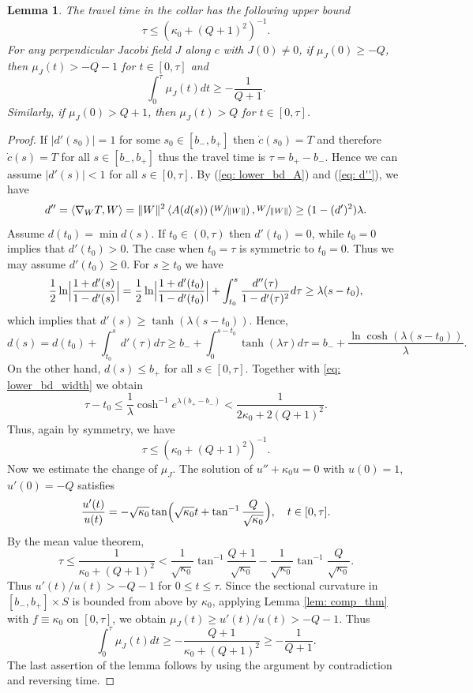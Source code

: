 \documentclass[10pt]{amsart}
\newtheorem{lemma}[theorem]{Lemma}
\theoremstyle{definition}
\renewcommand{\>}{{\rangle}}
\newcommand{\<}{{\langle}}
\begin{document}
\begin{lemma}\label{lem: bdd_trav_time}
The travel time in the collar has the following upper bound
\[
\tau\leq(\kappa_0+(Q+1)^2)^{-1}.
\]
For any perpendicular Jacobi field $J$ along $c$ with $J(0)\neq 0$, if $\mu_J(0)\geq -Q$, then $\mu_J(t)>-Q-1$ for $t\in [0,\tau]$ and
\[
\int_0^\tau \mu_J(t)dt\geq -\frac{1}{Q+1}.
\]
Similarly, if $\mu_J(0)>Q+1$, then $\mu_J(t)>Q$ for $t\in [0,\tau]$.
\end{lemma}
\begin{proof}
If $|d'(s_0)|=1$ for some $s_0\in [b_-, b_+]$ then $\dot c(s_0)=T$ and therefore $\dot{c}(s)=T$ for all $s\in [b_-, b_+]$ thus the travel time is $\tau=b_+-b_-$. Hence we can assume $|d'(s)|<1$ for all $s\in [0,\tau]$. By (\ref{eq: lower_bd_A}) and (\ref{eq: d''}), we have
\[
d''=\langle \nabla_W T, W\rangle=\|W\|^2\left\langle A(d(s))\left(\sfrac{W}{\|W\|}\right), \sfrac{W}{\|W\|}\right\rangle\geq (1-(d')^2)\lambda.
\]
Assume $d(t_0)=\min d(s)$. If $t_0\in(0,\tau)$ then $d'(t_0)=0$, while $t_0=0$ implies that $d'(t_0)>0$. The case when $t_0=\tau$ is symmetric to $t_0=0$. Thus we may assume $d'(t_0)\geq 0$. For $s\geq t_0$ we have
\[
\frac{1}{2}\ln\Bigl|\frac{1+d'(s)}{1-d'(s)}\Bigr|=\frac{1}{2}\ln\Bigl|\frac{1+d'(t_0)}{1-d'(t_0)}\Bigr|+\int_{t_0}^s \frac{d''(\tau)}{1-d'(\tau)^2}d\tau\geq\lambda (s-t_0),
\]
which implies that $d'(s)\geq \tanh(\lambda (s-t_0))$. Hence,
\[
d(s)=d(t_0)+\int_{t_0}^sd'(\tau)d\tau \geq b_-+\int_{0}^{s-t_0}\tanh(\lambda\tau)d\tau=b_-+\frac{\ln\cosh(\lambda (s-t_0))}{\lambda}.
\]
On the other hand, $d(s)\leq b_+$ for all $s\in [0,\tau]$. Together with \eqref{eq: lower_bd_width} we obtain
\[
\tau-t_0\leq \frac{1}{\lambda}\cosh^{-1}e^{\lambda(b_+-b_-)}<\frac{1}{2\kappa_0+2(Q+1)^2}.
\]
Thus, again by symmetry, we have
\[
\tau\leq(\kappa_0+(Q+1)^2)^{-1}.
\]
Now we estimate the change of $\mu_J$. The solution of $u''+\kappa_0u=0$ with $u(0)=1$, $u'(0)=-Q$ satisfies
\[
\frac{u'(t)}{u(t)}=-\sqrt{\kappa_0}\tan\Bigl(\sqrt{\kappa_0}t+\tan^{-1}\frac{Q}{\sqrt{\kappa_0}}\Bigr), \quad t\in [0,\tau].
\]
By the mean value theorem,
\[
\tau\leq \frac{1}{\kappa_0+(Q+1)^2}<\frac{1}{\sqrt{\kappa_0}}\tan^{-1}\frac{Q+1}{\sqrt{\kappa_0}}-\frac{1}{\sqrt{\kappa_0}}\tan^{-1}\frac{Q}{\sqrt{\kappa_0}}.
\]
Thus $u'(t)/u(t)>-Q-1$ for $0\leq t\leq \tau$. Since the sectional curvature in $[b_-, b_+] \times S$ is bounded from above by $\kappa_0$, applying Lemma \ref{lem: comp_thm} with $f\equiv \kappa_0$ on $[0,\tau]$, we obtain $\mu_J(t)\geq u'(t)/u(t)>-Q-1$. Thus
\[
\int_0^\tau \mu_J(t)dt\geq -\frac{Q+1}{\kappa_0+(Q+1)^2}\geq -\frac{1}{Q+1}.
\]
The last assertion of the lemma follows by using the argument by contradiction and reversing time.
\end{proof}
\end{document}
